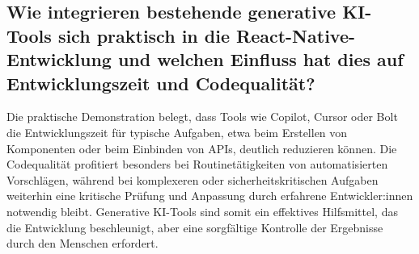 \subsection*{Wie integrieren bestehende generative KI-Tools sich praktisch in die React-Native-Entwicklung und welchen Einfluss hat dies auf Entwicklungszeit und Codequalität?}
Die praktische Demonstration belegt, dass Tools wie Copilot, Cursor oder Bolt
die Entwicklungszeit für typische Aufgaben, etwa beim Erstellen von Komponenten
oder beim Einbinden von APIs, deutlich reduzieren können. Die Codequalität
profitiert besonders bei Routinetätigkeiten von automatisierten Vorschlägen,
während bei komplexeren oder sicherheitskritischen Aufgaben weiterhin eine
kritische Prüfung und Anpassung durch erfahrene Entwickler:innen notwendig
bleibt. Generative KI-Tools sind somit ein effektives Hilfsmittel, das die
Entwicklung beschleunigt, aber eine sorgfältige Kontrolle der Ergebnisse durch
den Menschen erfordert.





